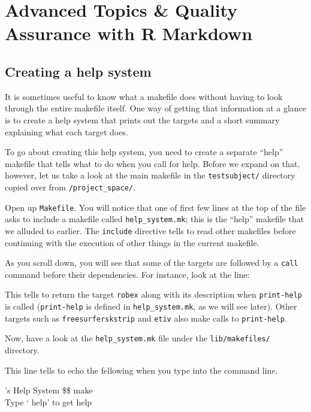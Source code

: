 \chapter{Advanced Topics \& Quality Assurance with R Markdown} 
\label{sec:practicum4}

\section{Creating a \maken{} help system}
It is sometimes useful to know what a makefile does without having to look through the entire makefile itself. One way of getting that information at a glance is to create a \maken{} help system that prints out the targets and a short summary explaining what each target does. 

To go about creating this help system, you need to create a separate ``help'' makefile that tells \maken{} what to do when you call for help. Before we expand on that, however, let us take a look at the main makefile in the \texttt{testsubject/} directory copied over from \texttt{/project_space/}.

Open up \texttt{Makefile}. You will notice that one of first few lines at the top of the file asks \maken{} to include a makefile called \texttt{help_system.mk}; this is the ``help'' makefile that we alluded to earlier. The \texttt{include} directive tells \maken{} to read other makefiles before continuing with the execution of other things in the current makefile.  

As you scroll down, you will see that some of the targets are followed by a \texttt{call} command before their dependencies. For instance, look at the line:

This tells \maken{} to return the target \texttt{robex} along with its description when \texttt{print-help} is called (\texttt{print-help} is defined in \texttt{help_system.mk}, as we will see later). Other targets such as \texttt{freesurferskstrip} and \texttt{etiv} also make calls to \texttt{print-help}.

Now, have a look at the \texttt{help_system.mk} file under the \texttt{lib/makefiles/} directory.  

This line tells \maken{} to echo the fellowing when you type \maken{} into the command line.
\begin{bash}{\maken{}'s Help System}{}
\$\$ make \\
Type `\maken{} help' to get help
\end{bash}

